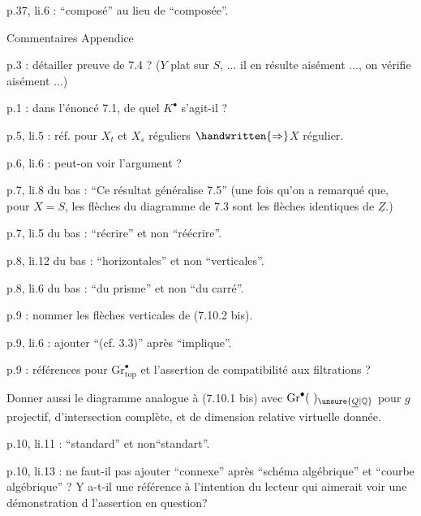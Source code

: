
p.37, li.6 : ``composé'' au lieu de ``composée''.

\begin{center}
Commentaires Appendice
\end{center}

p.3 : détailler preuve de 7.4 ? ($Y$ plat sur $S$, ... il en résulte aisément ..., on vérifie aisément ...)

p.1 : dans l'énoncé 7.1, de quel $K^{\bullet}$ s'agit-il ?

p.5, li.5 : réf. pour $X_t$ et $X_s$ réguliers $\handwritten{\Rightarrow}$$X$ régulier.

p.6, li.6 : peut-on voir l'argument ?

p.7, li.8 du bas : ``Ce résultat généralise 7.5'' (une fois qu'on a remarqué que, pour $X = S$, les flèches du diagramme de 7.3 sont les flèches identiques de $\underline{Z}$.)

p.7, li.5 du bas : ``récrire'' et non ``réécrire''.

p.8, li.12 du bas : ``horizontales'' et non ``verticales''.

p.8, li.6 du bas : ``du prisme'' et non ``du carré''.

p.9 : nommer les flèches verticales de (7.10.2 bis).

p.9, li.6 : ajouter ``(cf. 3.3)'' après ``implique''.

p.9 : références pour $\mathrm{Gr}^{\bullet}_{\mathrm{top}}$ et l'assertion de compatibilité aux filtrations ?

Donner aussi le diagramme analogue à (7.10.1 bis) avec $\mathrm{Gr}^{\bullet}(\ )_{\unsure{\underline{Q}|\mathbb{Q}}}$ pour $g$ projectif, d'intersection complète, et de dimension relative virtuelle donnée.

p.10, li.11 : ``standard'' et non``standart''.

p.10, li.13 : ne faut-il pas ajouter ``connexe'' après ``schéma algébrique'' et ``courbe algébrique'' ? Y a-t-il une référence à l'intention du lecteur qui aimerait voir une démonstration d l'assertion en question?

